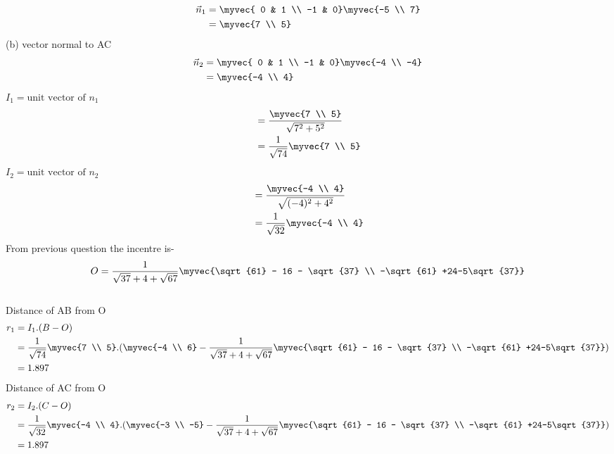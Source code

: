 \documentclass[journal,12pt,twocolumn]{IEEEtran}
\theoremstyle{remark}
\begin{document}
\begin{align}
\vec{n}_1 &= \myvec{ 0 & 1 \\ -1 & 0}\myvec{-5 \\ 7}\\
&= \myvec{7 \\ 5}
\end{align}
(b) vector normal to AC
\begin{align}
\vec{n}_2 &= \myvec{ 0 & 1 \\ -1 & 0}\myvec{-4 \\ -4}\\
&= \myvec{-4 \\ 4}
\end{align}
$I_1 = \text{unit vector of }n_1$
\begin{align}
&= \frac{\myvec{7 \\ 5}}{\sqrt{7^2 + 5^2}}\\
&=\frac{1}{\sqrt{74}}\myvec{7 \\ 5}
\end{align}
$I_2= \text{unit vector of } n_2 $
\begin{align}
&= \frac{\myvec{-4 \\ 4}}{\sqrt{(-4)^2 + 4^2}}\\
&=\frac{1}{\sqrt{32}}\myvec{-4 \\ 4}
\end{align}
From previous question the incentre is-
\begin{align}
O = \frac{1}{\sqrt{37} + 4 + \sqrt{67}}\myvec{\sqrt{61} - 16 - \sqrt{37} \\ -\sqrt{61} +24-5\sqrt{37}} 
\end{align}\\
Distance of AB from O
\begin{align}
r_1 &= I_1 . (B-O)\\
&= \frac{1}{\sqrt{74}}\myvec{7 \\ 5} . (\myvec{-4 \\ 6} - \frac{1}{\sqrt{37} + 4 + \sqrt{67}}\myvec{\sqrt{61} - 16 - \sqrt{37} \\ -\sqrt{61} +24-5\sqrt{37}} )\\
&= 1.897
\end{align}
Distance of AC from O
\begin{align}
r_2 &= I_2 . (C-O)\\
&= \frac{1}{\sqrt{32}}\myvec{-4 \\ 4} . (\myvec{-3 \\ -5} - \frac{1}{\sqrt{37} + 4 + \sqrt{67}}\myvec{\sqrt{61} - 16 - \sqrt{37} \\ -\sqrt{61} +24-5\sqrt{37}} )\\
&= 1.897
\end{align}
\end{document}
